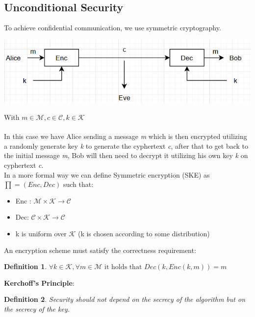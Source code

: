 \documentclass[11pt, a4paper]{article}
\newtheorem{defn}{Definition}
\begin{document}
\subsection{Unconditional Security}
To achieve confidential communication, we use symmetric cryptography.
\begin{center}
    \includegraphics{img/US.png}
\end{center}
With $m \in \mathcal{M}, c \in \mathcal{C}, k \in \mathcal{K}$\\\\
In this case we have Alice sending a message \textit{m} which is then encrypted utilizing a randomly generate key \textit{k} to generate the cyphertext \textit{c}, after that to get back to the initial message \textit{m}, Bob will then need to decrypt it utilizing his own key \textit{k} on cyphertext \textit{c}.\\
In a more formal way we can define Symmetric encryption (SKE) as $\prod = (Enc, Dec)$ such that:
\begin{itemize}
    \item Enc : $\mathcal{M} \times \mathcal{K} \rightarrow \mathcal{C}$
    \item Dec: $\mathcal{C} \times \mathcal{K} \rightarrow \mathcal{C}$
    \item k is uniform over $\mathcal{K}$ (k is chosen according to some distribution)
\end{itemize}
An encryption scheme must satisfy the correctness requirement:
\begin{defn}
    $\forall k \in \mathcal{K}, \forall m \in \mathcal{M} \text{ it holds that } Dec(k,Enc(k,m)) = m$
\end{defn}

\textbf{Kerchoff's Principle}:
\begin{defn}
    Security should not depend on the secrecy of the algorithm but on the secrecy of the key.
\end{defn}
\end{document}

